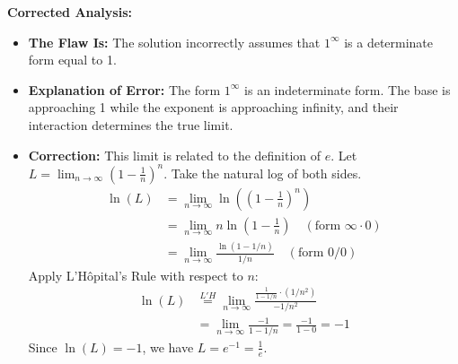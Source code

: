 \documentclass{article}
\begin{document}
\textbf{Corrected Analysis:}
\begin{itemize}
    \item \textbf{The Flaw Is:} The solution incorrectly assumes that $1^\infty$ is a determinate form equal to 1.
    \item \textbf{Explanation of Error:} The form $1^\infty$ is an indeterminate form. The base is approaching 1 while the exponent is approaching infinity, and their interaction determines the true limit.
    \item \textbf{Correction:} This limit is related to the definition of $e$. Let $L = \lim_{n \to \infty} \left(1 - \frac{1}{n}\right)^n$. Take the natural log of both sides.
    \begin{align*}
      \ln(L) &= \lim_{n \to \infty} \ln\left( \left(1 - \frac{1}{n}\right)^n \right) \\
      &= \lim_{n \to \infty} n \ln\left(1 - \frac{1}{n}\right) \quad (\text{form } \infty \cdot 0) \\
      &= \lim_{n \to \infty} \frac{\ln(1 - 1/n)}{1/n} \quad (\text{form } 0/0)
    \end{align*}
    Apply L'Hôpital's Rule with respect to $n$:
    \begin{align*}
      \ln(L) &\overset{L'H}{=} \lim_{n \to \infty} \frac{\frac{1}{1-1/n} \cdot (1/n^2)}{-1/n^2} \\
      &= \lim_{n \to \infty} \frac{-1}{1-1/n} = \frac{-1}{1-0} = -1
    \end{align*}
    Since $\ln(L) = -1$, we have $L = e^{-1} = \frac{1}{e}$.
\end{itemize}
\end{document}
